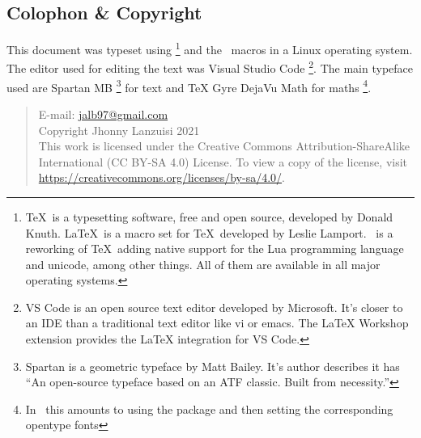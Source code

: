 \newpage
\begin{small}
    \begin{center}
    \begin{minipage}{0.4\paperwidth}
        \section*{Colophon \& Copyright}
        This document was typeset using \LuaTeX%
        \footnote{%
            \TeX\ is
            a typesetting software, free and open source,
            developed by Donald Knuth. \LaTeX\ is a macro
            set for \TeX\ developed by Leslie Lamport. \LuaTeX\ is
            a reworking of \TeX\ adding native support for the Lua
            programming language and unicode, among other things.
            All of them are available in all major
            operating systems.
        }
        and the \LaTeXe\ macros in a Linux operating system.
        The editor used for editing the text was Visual Studio Code%
        \footnote{%
            VS Code is an open source text editor
            developed by Microsoft.
            It's closer to an IDE than a traditional text editor
            like vi or emacs.
            The LaTeX Workshop extension provides the LaTeX
            integration for VS Code.
        }.
        The main typeface used are Spartan MB%
        \footnote{%
            Spartan is a geometric typeface
            by Matt Bailey. It's author describes it has
            ``An open-source typeface based on an ATF classic. 
            Built from necessity.''
        }
        for text and TeX Gyre DejaVu Math for maths%
        \footnote{%
            In \LuaLaTeX\ this amounts to using the package
            and then setting the corresponding
            opentype fonts
        }.

        \medskip
        \begin{quote}\ttfamily\raggedright%
            E-mail: \url{jalb97@gmail.com} \\
            Copyright Jhonny Lanzuisi 2021\\
            This work is licensed under the Creative Commons Attribution-ShareAlike
            International (CC BY-SA 4.0)  License. To view a copy of the license,
            visit \url{https://creativecommons.org/licenses/by-sa/4.0/}.
        \end{quote}
    \end{minipage}
    \end{center}
\end{small}
\newpage
\tableofcontents
